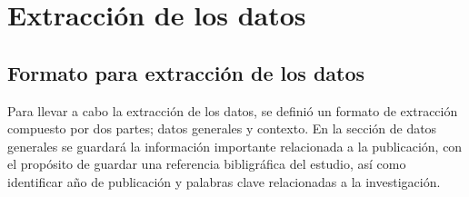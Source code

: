 \documentclass{article}
\begin{document}
\begin{center}
\begin{table}[ht]
        \caption{Calidad} 
        \centering 
        \label{table:tablacalidad}
\end{table}
\end{center}

\newpage

\section{Extracción de los datos}
\subsection{Formato para extracción de los datos}
Para llevar a cabo la extracción de los datos, se definió un formato de extracción compuesto por dos partes; datos generales y contexto.
En la sección de datos generales se guardará la información importante relacionada a la publicación, con el propósito de guardar 
una referencia bibligráfica del estudio, así como identificar año de publicación y palabras clave relacionadas a la investigación. 
\end{document}
